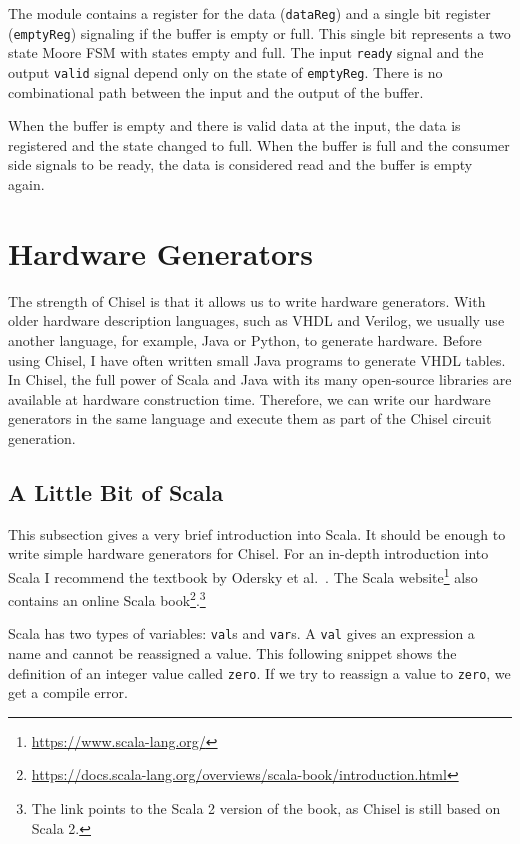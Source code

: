 \documentclass[%
    10pt,
    headinclude, footexclude,
    openright, %
    notitlepage,
    cleardoubleempty,
    headsepline,
    pointlessnumbers,
    bibtotoc, idxtotoc,
    ]{scrbook}
\newcommand{\code}[1]{{\lstinline[basicstyle=\small\ttfamily]{#1}}}
\newcommand{\myref}[2]{\href{#1}{#2}}
\renewcommand{\myref}[2]{{#2}{\footnote{\url{#1}}}}
\begin{document}
The module contains a register for the data (\code{dataReg}) and a single bit
register (\code{emptyReg}) signaling if the buffer is empty or full.
This single bit represents a two state Moore FSM with states empty and full.
The input \code{ready} signal and the output \code{valid} signal depend only
on the state of \code{emptyReg}. There is no combinational path between the
input and the output of the buffer.

When the buffer is empty and there is valid data at the input, the data is registered
and the state changed to full. When the buffer is full and the consumer side signals
to be ready, the data is considered read and the buffer is empty again.



\chapter{Hardware Generators}
\label{ch:gen}

The strength of Chisel is that it allows us to write hardware generators.
With older hardware description languages, such as VHDL and Verilog,
we usually use another language, for example, Java or Python, to generate hardware.
Before using Chisel, I have often written small Java programs to generate VHDL tables.
In Chisel, the full power of Scala and Java with its many open-source libraries
are available at hardware construction time. Therefore, we can write our hardware
generators in the same language and execute them as part of the Chisel circuit generation.

\section{A Little Bit of Scala}

This subsection gives a very brief introduction into Scala. It should be enough
to write simple hardware generators for Chisel.
For an in-depth introduction into Scala I recommend the textbook by Odersky et al.~\cite{Scala}.
The \myref{https://www.scala-lang.org/}{Scala website} also contains an
\myref{https://docs.scala-lang.org/overviews/scala-book/introduction.html}{online Scala book}.\footnote{The link
points to the Scala 2 version of the book, as Chisel is still based on Scala 2.}

Scala has two types of variables: \code{val}s and \code{var}s. A \code{val} gives an expression
a name and cannot be reassigned a value. This following snippet shows the definition of
an integer value called \code{zero}. If we try to reassign a value to \code{zero}, we get
a compile error.
\end{document}

